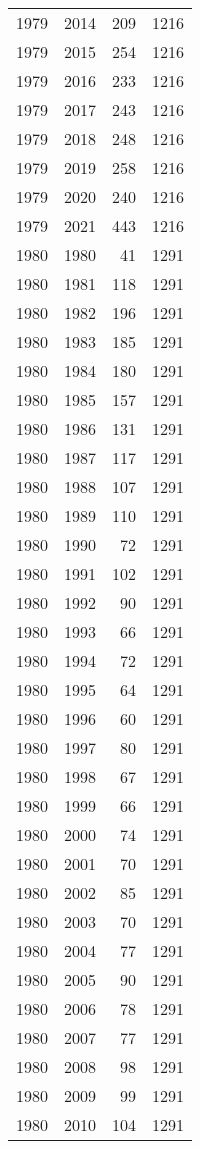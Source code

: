 \documentclass[
  11pt,
  letterpaper,
  DIV=11,
  numbers=noendperiod,
  twoside]{scrartcl}
\begin{document}
\begin{longtable}[]{@{}rrrr@{}}
1979 & 2014 & 209 & 1216 \\
1979 & 2015 & 254 & 1216 \\
1979 & 2016 & 233 & 1216 \\
1979 & 2017 & 243 & 1216 \\
1979 & 2018 & 248 & 1216 \\
1979 & 2019 & 258 & 1216 \\
1979 & 2020 & 240 & 1216 \\
1979 & 2021 & 443 & 1216 \\
1980 & 1980 & 41 & 1291 \\
1980 & 1981 & 118 & 1291 \\
1980 & 1982 & 196 & 1291 \\
1980 & 1983 & 185 & 1291 \\
1980 & 1984 & 180 & 1291 \\
1980 & 1985 & 157 & 1291 \\
1980 & 1986 & 131 & 1291 \\
1980 & 1987 & 117 & 1291 \\
1980 & 1988 & 107 & 1291 \\
1980 & 1989 & 110 & 1291 \\
1980 & 1990 & 72 & 1291 \\
1980 & 1991 & 102 & 1291 \\
1980 & 1992 & 90 & 1291 \\
1980 & 1993 & 66 & 1291 \\
1980 & 1994 & 72 & 1291 \\
1980 & 1995 & 64 & 1291 \\
1980 & 1996 & 60 & 1291 \\
1980 & 1997 & 80 & 1291 \\
1980 & 1998 & 67 & 1291 \\
1980 & 1999 & 66 & 1291 \\
1980 & 2000 & 74 & 1291 \\
1980 & 2001 & 70 & 1291 \\
1980 & 2002 & 85 & 1291 \\
1980 & 2003 & 70 & 1291 \\
1980 & 2004 & 77 & 1291 \\
1980 & 2005 & 90 & 1291 \\
1980 & 2006 & 78 & 1291 \\
1980 & 2007 & 77 & 1291 \\
1980 & 2008 & 98 & 1291 \\
1980 & 2009 & 99 & 1291 \\
1980 & 2010 & 104 & 1291 \\

\end{longtable}
\end{document}
